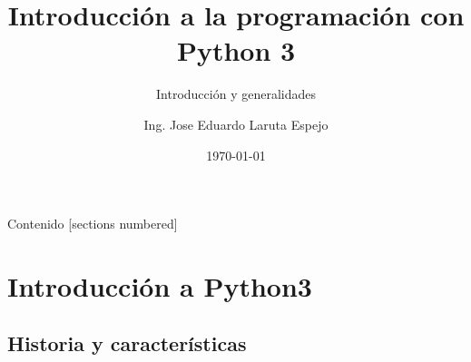 \documentclass[10pt]{beamer}
\title{Introducción a la programación con Python 3}
\subtitle{Introducción y generalidades}
\date{\today}
\author{Ing. Jose Eduardo Laruta Espejo}
\institute{Cognos}
\begin{document}
\maketitle

\begin{frame}[allowframebreaks]{Contenido}
  [sections numbered]
  \tableofcontents[]
\end{frame}


\section{Introducción a Python3}
\subsection{Historia y características}
\end{document}
